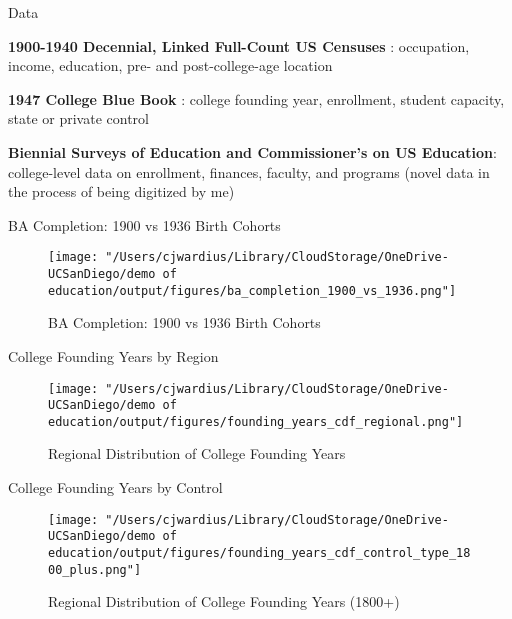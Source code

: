 \documentclass[notes,11pt, aspectratio=169]{beamer}
\newenvironment{wideitemize}{\itemize\addtolength{\itemsep}{10pt}}{\enditemize}
\begin{document}
\begin{frame}{Data}
  \begin{wideitemize}
    \item \textbf{1900-1940 Decennial, Linked Full-Count US Censuses} \cite{rugglesIPUMSUSAVersion2025}: occupation, income, education, pre- and post-college-age location
    \item \textbf{1947 College Blue Book} \cite{hurt1947college}: college founding year, enrollment, student capacity, state or private control
    \item \textbf{Biennial Surveys of Education and Commissioner's on US Education}: college-level data on enrollment, finances, faculty, and programs (novel data in the process of being digitized by me)  
  \end{wideitemize}
\end{frame}


\begin{frame}{BA Completion: 1900 vs 1936 Birth Cohorts}
    \begin{figure}
        \centering
        \texttt{[image: "/Users/cjwardius/Library/CloudStorage/OneDrive-UCSanDiego/demo of education/output/figures/ba\_completion\_1900\_vs\_1936.png"]}
        \caption{BA Completion: 1900 vs 1936 Birth Cohorts}
    \end{figure}
\end{frame}

\begin{frame}{College Founding Years by Region}
    \begin{figure}
        \centering
        \texttt{[image: "/Users/cjwardius/Library/CloudStorage/OneDrive-UCSanDiego/demo of education/output/figures/founding\_years\_cdf\_regional.png"]}
        \caption{Regional Distribution of College Founding Years}
    \end{figure}
\end{frame}

\begin{frame}{College Founding Years by Control}
    \begin{figure}
        \centering
        \texttt{[image: "/Users/cjwardius/Library/CloudStorage/OneDrive-UCSanDiego/demo of education/output/figures/founding\_years\_cdf\_control\_type\_1800\_plus.png"]}
        \caption{Regional Distribution of College Founding Years (1800+)}
    \end{figure}
\end{frame}
\end{document}
